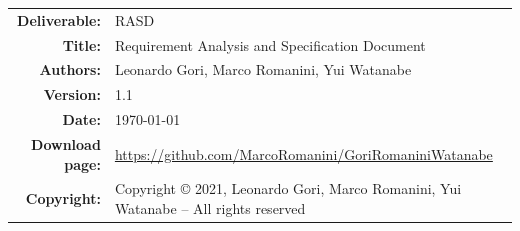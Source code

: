 


\begin{table}[H]
    \setlength\arrayrulewidth{1pt}
    \centering
    \begin{tabular}{rl}
        \hline
        \textbf{Deliverable:} & RASD\\
        \textbf{Title:} & Requirement Analysis and Specification Document \\
        \textbf{Authors:} & Leonardo Gori, Marco Romanini, Yui Watanabe \\
        \textbf{Version:} & 1.1 \\ 
        \textbf{Date:} & \today \\
        \textbf{Download page:} & \url{https://github.com/MarcoRomanini/GoriRomaniniWatanabe} \\
        \textbf{Copyright:} & Copyright © 2021, Leonardo Gori, Marco Romanini, Yui Watanabe – All rights reserved \\
        \hline
    \end{tabular}
\end{table}

\setcounter{page}{2}


\newpage
{}
\tableofcontents
\newpage
{}
\listoffigures
{}
\listoftables

